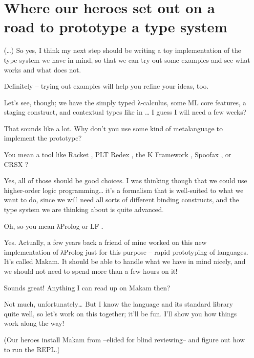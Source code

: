 \section{Where our heroes set out on a road to prototype a type
system}\label{where-our-heroes-set-out-on-a-road-to-prototype-a-type-system}

 (\ldots{}) So yes, I think my next step should be
writing a toy implementation of the type system we have in mind, so that
we can try out some examples and see what works and what does not.

 Definitely -- trying out examples will help you
refine your ideas, too.

\heroSTUDENT{} Let's see, though; we have the simply typed \foreignlanguage{greek}{λ}-calculus, some ML
core features, a staging construct, and contextual types like in
\citet{nanevski2008contextual}\ldots{} I guess I will need a few weeks?

\heroADVISOR{} That sounds like a lot. Why don't you use some kind of
metalanguage to implement the prototype?

\heroSTUDENT{} You mean a tool like Racket \citep{racket-manifesto}, PLT Redex
\citep{felleisen2009semantics}, the K Framework
\citep{rosu2010overview}, Spoofax \citep{kats2010spoofax}, or CRSX
\citep{rose2011crsx}?

\heroADVISOR{} Yes, all of those should be good choices. I was thinking though
that we could use higher-order logic programming\ldots{} it's a
formalism that is well-suited to what we want to do, since we will need
all sorts of different binding constructs, and the type system we are
thinking about is quite advanced.

\heroSTUDENT{} Oh, so you mean \foreignlanguage{greek}{λ}Prolog \citep{miller1988overview} or LF
\citep{lf-main-reference}.

\heroADVISOR{} Yes. Actually, a few years back a friend of mine worked on this
new implementation of \foreignlanguage{greek}{λ}Prolog just for this purpose -- rapid prototyping
of languages. It's called Makam. It should be able to handle what we
have in mind nicely, and we should not need to spend more than a few
hours on it!

\heroSTUDENT{} Sounds great! Anything I can read up on Makam then?

\heroADVISOR{} Not much, unfortunately\ldots{} But I know the language and its
standard library quite well, so let's work on this together; it'll be
fun. I'll show you how things work along the way!

\begin{scenecomment}
(Our heroes install Makam from --elided for blind reviewing-- and figure out how to run the REPL.)
\end{scenecomment}
